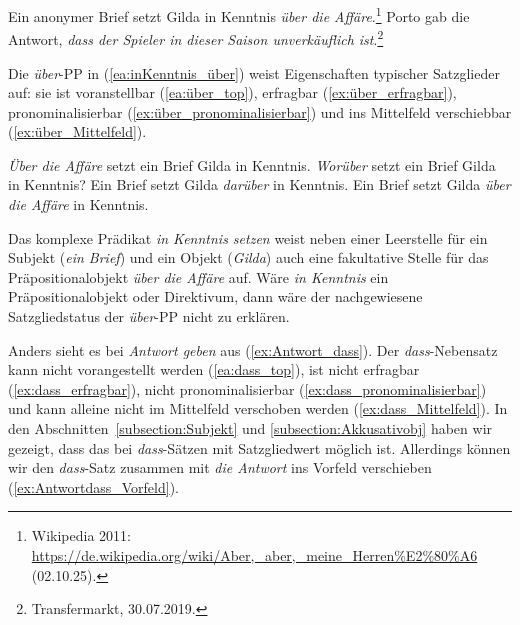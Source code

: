 \ea \label{ea:Pobjekt_Attribut}
\ea \label{ea:inKenntnis_über} Ein anonymer Brief setzt Gilda in Kenntnis \textit{über die Affäre}.\footnote{Wikipedia 2011: \url{https://de.wikipedia.org/wiki/Aber,_aber,_meine_Herren\%E2\%80\%A6} (02.10.25).}
\ex \label{ex:Antwort_dass} Porto gab die Antwort, \textit{dass der Spieler in dieser Saison unverkäuflich ist}.\footnote{Transfermarkt, 30.07.2019.}
\z 
\z 

Die \textit{über}-PP in (\ref{ea:inKenntnis_über}) weist Eigenschaften typischer Satzglieder auf: sie ist voranstellbar (\ref{ea:über_top}), erfragbar (\ref{ex:über_erfragbar}), pronominalisierbar (\ref{ex:über_pronominalisierbar}) und ins Mittelfeld verschiebbar (\ref{ex:über_Mittelfeld}).

\ea \label{ea:Kenntnis_über_SG}
\ea \label{ea:über_top} \textit{Über die Affäre} setzt ein Brief Gilda in Kenntnis.
\ex \label{ex:über_erfragbar} \textit{Worüber} setzt ein Brief Gilda in Kenntnis?
\ex \label{ex:über_pronominalisierbar} Ein Brief setzt Gilda \textit{darüber} in Kenntnis.
\ex \label{ex:über_Mittelfeld} Ein Brief setzt Gilda \textit{über die Affäre} in Kenntnis.
\z 
\z 

Das komplexe Prädikat \textit{in Kenntnis setzen} weist neben einer Leerstelle für ein Subjekt (\textit{ein Brief}) und ein Objekt (\textit{Gilda}) auch eine fakultative Stelle für das Präpositionalobjekt \textit{über die Affäre} auf. Wäre \textit{in Kenntnis} ein Präpositionalobjekt oder Direktivum, dann wäre der nachgewiesene Satzgliedstatus der \textit{über}-PP nicht zu erklären.

Anders sieht es bei \textit{Antwort geben} aus (\ref{ex:Antwort_dass}). Der \textit{dass}-Nebensatz kann nicht vorangestellt werden (\ref{ea:dass_top}), ist nicht erfragbar (\ref{ex:dass_erfragbar}), nicht pronominalisierbar (\ref{ex:dass_pronominalisierbar}) und kann alleine nicht im Mittelfeld verschoben werden (\ref{ex:dass_Mittelfeld}). In den Abschnitten~\ref{subsection:Subjekt} und \ref{subsection:Akkusativobj} haben wir gezeigt, dass das bei \textit{dass}-Sätzen mit Satzgliedwert möglich ist. Allerdings können wir den \textit{dass}-Satz zusammen mit \textit{die Antwort} ins Vorfeld verschieben (\ref{ex:Antwortdass_Vorfeld}). 

\largerpage
\ea \label{ea:Antwort_dass_SG}
\label{ea:dass_top}
\label{ex:dass_erfragbar}
\label{ex:dass_pronominalisierbar} 
\label{ex:dass_Mittelfeld}
\label{ex:Antwortdass_Vorfeld}
\z 
\z 

